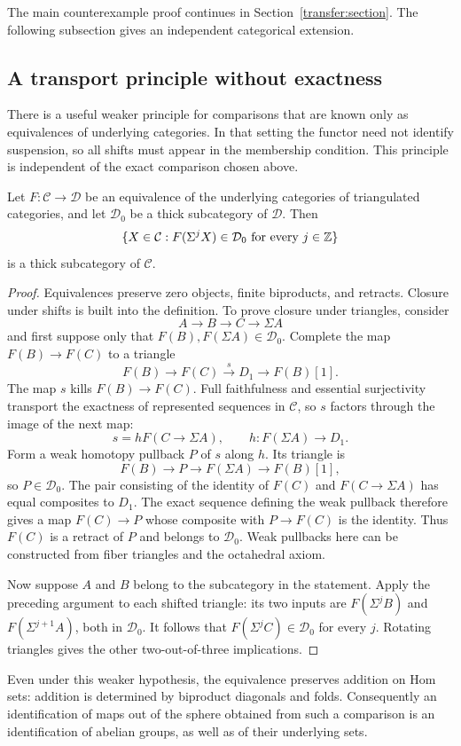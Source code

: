 The main counterexample proof continues in
Section~\ref{transfer:section}. The following subsection gives an
independent categorical extension.

\subsection{A transport principle without exactness}
\label{rew:comp:weaker-transport}

There is a useful weaker principle for comparisons that are known
only as equivalences of underlying categories. In that setting the
functor need not identify suspension, so all shifts must appear in
the membership condition. This principle is independent of the exact
comparison chosen above.

\begin{lemma}
\label{comp:thick-transport}
Let $F:\mathcal C\to\mathcal D$ be an equivalence of the underlying
categories of triangulated categories, and let $\mathcal D_0$ be a
thick subcategory of $\mathcal D$. Then
\[
 \{X\in\mathcal C:
       F(\Sigma^jX)\in\mathcal D_0\text{ for every }j\in\mathbb Z\}
\]
is a thick subcategory of $\mathcal C$.
\end{lemma}

\begin{proof}
Equivalences preserve zero objects, finite biproducts, and retracts.
Closure under shifts is built into the definition. To prove closure
under triangles, consider
\[
 A\longrightarrow B\longrightarrow C\longrightarrow\Sigma A
\]
and first suppose only that $F(B),F(\Sigma A)\in\mathcal D_0$.
Complete the map $F(B)\to F(C)$ to a triangle
\[
 F(B)\longrightarrow F(C)\xrightarrow{s}D_1\longrightarrow F(B)[1].
\]
The map $s$ kills $F(B)\to F(C)$. Full faithfulness and essential
surjectivity transport the exactness of represented sequences in
$\mathcal C$, so $s$ factors through the image of the next map:
\[
 s=hF(C\to\Sigma A),\qquad h:F(\Sigma A)\longrightarrow D_1.
\]
Form a weak homotopy pullback $P$ of $s$ along $h$. Its triangle is
\[
 F(B)\longrightarrow P\longrightarrow F(\Sigma A)
     \longrightarrow F(B)[1],
\]
so $P\in\mathcal D_0$. The pair consisting of the identity of $F(C)$
and $F(C\to\Sigma A)$ has equal composites to $D_1$. The exact
sequence defining the weak pullback therefore gives a map
$F(C)\to P$ whose composite with $P\to F(C)$ is the identity.
Thus $F(C)$ is a retract of $P$ and belongs to $\mathcal D_0$.
Weak pullbacks here can be constructed from fiber triangles and the
octahedral axiom.

Now suppose $A$ and $B$ belong to the subcategory in the statement.
Apply the preceding argument to each shifted triangle: its two inputs
are $F(\Sigma^jB)$ and $F(\Sigma^{j+1}A)$, both in $\mathcal D_0$.
It follows that $F(\Sigma^jC)\in\mathcal D_0$ for every $j$.
Rotating triangles gives the other two-out-of-three implications.
\end{proof}

Even under this weaker hypothesis, the equivalence preserves addition
on Hom sets: addition is determined by biproduct diagonals and folds.
Consequently an identification of maps out of the sphere obtained from
such a comparison is an identification of abelian groups, as well as
of their underlying sets.
